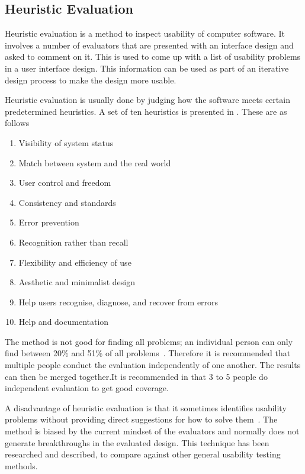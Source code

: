 \subsection{Heuristic Evaluation}
Heuristic evaluation is a method to inspect usability of computer
software. It involves a number of evaluators that are presented with
an interface design and asked to comment on it. This is used to come
up with a list of usability problems in a user interface design. This
information can be used as part of an iterative design process to make the design more usable.

Heuristic evaluation is usually done by judging how the software meets
certain predetermined heuristics. A set of ten heuristics
is presented in . These are as follows

\begin{enumerate}
  \item Visibility of system status
  \item Match between system and the real world
  \item User control and freedom
  \item Consistency and standards
  \item Error prevention
  \item Recognition rather than recall
  \item Flexibility and efficiency of use
  \item Aesthetic and minimalist design
  \item Help users recognise, diagnose, and recover from errors
  \item Help and documentation
\end{enumerate}

The method is not good for finding all problems; an individual person
can only find between 20\% and 51\% of all
problems~\cite{Nielsen1990}. Therefore it is recommended that multiple
people conduct the evaluation independently of one another. The
results can then be merged together.It is recommended in  that 3 to 5 people do independent evaluation to get good coverage.

A disadvantage of heuristic evaluation is that it sometimes identifies usability problems without providing direct suggestions for how to solve them~\cite{Nielsen1990}. The method is biased by the current mindset of the evaluators and normally does not generate breakthroughs in the evaluated design. This technique has been researched and described, to compare against other general usability testing methods. 



